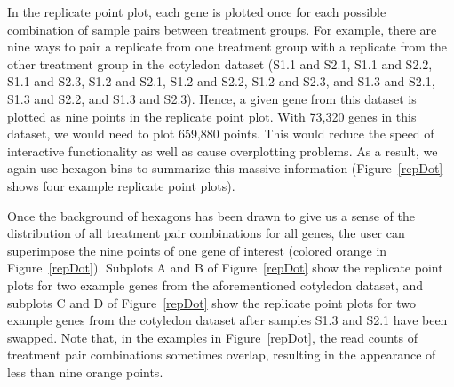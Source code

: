 \documentclass[referee]{biom}
\begin{document}
In the replicate point plot, each gene is plotted once for each possible combination of sample pairs between treatment groups. For example, there are nine ways to pair a replicate from one treatment group with a replicate from the other treatment group in the cotyledon dataset (S1.1 and S2.1, S1.1 and S2.2, S1.1 and S2.3, S1.2 and S2.1, S1.2 and S2.2, S1.2 and S2.3, and S1.3 and S2.1, S1.3 and S2.2, and S1.3 and S2.3). Hence, a given gene from this dataset is plotted as nine points in the replicate point plot. With 73,320 genes in this dataset, we would need to plot 659,880 points. This would reduce the speed of interactive functionality as well as cause overplotting problems. As a result, we again use hexagon bins to summarize this massive information (Figure~\ref{repDot} shows four example replicate point plots).

\newpage

Once the background of hexagons has been drawn to give us a sense of the distribution of all treatment pair combinations for all genes, the user can superimpose the nine points of one gene of interest (colored orange in Figure~\ref{repDot}). Subplots A and B of Figure~\ref{repDot} show the replicate point plots for two example genes from the aforementioned cotyledon dataset, and subplots C and D of Figure~\ref{repDot} show the replicate point plots for two example genes from the cotyledon dataset after samples S1.3 and S2.1 have been swapped. Note that, in the examples in Figure~\ref{repDot}, the read counts of treatment pair combinations sometimes overlap, resulting in the appearance of less than nine orange points.
\end{document}

